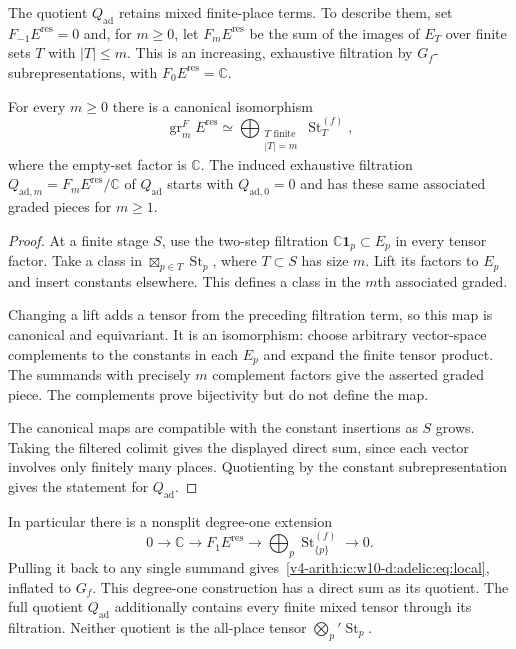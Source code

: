 The quotient $Q_{\mathrm{ad}}$ retains mixed finite-place terms. To describe them, set
$F_{-1}E^{\mathrm{res}}=0$ and, for $m\ge0$, let $F_mE^{\mathrm{res}}$
be the sum of the images of $E_T$ over finite sets $T$ with $|T|\le m$.
This is an increasing, exhaustive filtration by $G_f$-subrepresentations,
with $F_0E^{\mathrm{res}}=\mathbb C$.

\begin{proposition}\label{v4-arith:ic:w10-d:adelic:prop:filtration}
For every $m\ge0$ there is a canonical isomorphism
\[
 \operatorname{gr}_m^F E^{\mathrm{res}}
 \simeq\bigoplus_{\substack{T\text{ finite}\\|T|=m}}\operatorname{St}_T^{(f)},
\]
where the empty-set factor is $\mathbb C$. The induced exhaustive filtration
$Q_{\mathrm{ad},m}=F_mE^{\mathrm{res}}/\mathbb C$ of $Q_{\mathrm{ad}}$ starts with $Q_{\mathrm{ad},0}=0$ and has these
same associated graded pieces for $m\ge1$.
\end{proposition}
\begin{proof}
At a finite stage $S$, use the two-step filtration
$\mathbb C\mathbf1_p\subset E_p$ in every tensor factor. Take a class in $\boxtimes_{p\in T}\operatorname{St}_p$,
where $T\subset S$ has size $m$. Lift its factors to $E_p$
and insert constants elsewhere. This defines a class in the
$m$th associated graded.

Changing a lift adds a tensor from the preceding
filtration term, so this map is canonical and equivariant.
It is an isomorphism: choose arbitrary vector-space complements to the
constants in each $E_p$ and expand the finite tensor product. The
summands with precisely $m$ complement factors give the asserted graded
piece. The complements prove bijectivity but do not define the map.

The canonical maps are compatible with the constant insertions as $S$
grows. Taking the filtered colimit gives the displayed direct sum, since
each vector involves only finitely many places. Quotienting by the
constant subrepresentation gives the statement for $Q_{\mathrm{ad}}$.
\end{proof}

In particular there is a nonsplit degree-one extension
\[
 0\longrightarrow\mathbb C\longrightarrow F_1E^{\mathrm{res}}
   \longrightarrow\bigoplus_p\operatorname{St}_{\{p\}}^{(f)}\longrightarrow0.
\]
Pulling it back to any single summand gives~\eqref{v4-arith:ic:w10-d:adelic:eq:local}, inflated
to $G_f$. This degree-one construction has a direct sum as its quotient.
The full quotient $Q_{\mathrm{ad}}$ additionally contains every finite mixed tensor
through its filtration. Neither quotient is the all-place tensor
$\bigotimes_p'\operatorname{St}_p$.

